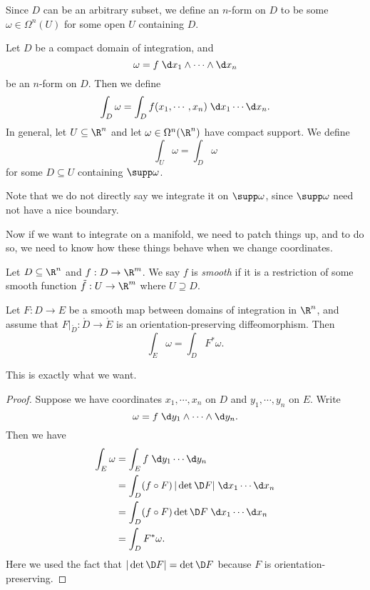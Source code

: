 \documentclass[a4paper]{article}
\begin{document}
Since $D$ can be an arbitrary subset, we define an $n$-form on $D$ to be some $\omega \in \Omega^n(U)$ for some open $U$ containing $D$.

\begin{defi}[Integration on $\R^n$]
  Let $D$ be a compact domain of integration, and
  \[
    \omega = f\; \d x_1 \wedge \cdots \wedge \d x_n
  \]
  be an $n$-form on $D$. Then we define
  \[
    \int_D \omega = \int_D f(x_1, \cdots, x_n) \;\d x_1 \cdots \d x_n.
  \]
  In general, let $U \subseteq \R^n$ and let $\omega \in \Omega^n(\R^n)$ have compact support. We define
  \[
    \int_U \omega = \int_D \omega
  \]
  for some $D\subseteq U$ containing $\supp \omega$.
\end{defi}
Note that we do not directly say we integrate it on $\supp \omega$, since $\supp \omega$ need not have a nice boundary.

Now if we want to integrate on a manifold, we need to patch things up, and to do so, we need to know how these things behave when we change coordinates.

\begin{defi}
  Let $D \subseteq \R^n$ and $f: D \to \R^m$. We say $f$ is \emph{smooth} if it is a restriction of some smooth function $\tilde{f}: U \to \R^m$ where $U \supseteq D$.
\end{defi}

\begin{lemma}
  Let $F: D \to E$ be a smooth map between domains of integration in $\R^n$, and assume that $F|_{\mathring{D}}: \mathring{D} \to \mathring{E}$ is an orientation-preserving diffeomorphism. Then
  \[
    \int_E \omega = \int_D F^* \omega.
  \]
\end{lemma}
This is exactly what we want.

\begin{proof}
  Suppose we have coordinates $x_1, \cdots, x_n$ on $D$ and $y_1, \cdots, y_n$ on $E$. Write
  \[
    \omega = f\;\d y_1 \wedge \cdots \wedge \d y_n.
  \]
  Then we have
  \begin{align*}
    \int_E \omega &= \int_E f\;\d y_1 \cdots \d y_n\\
    &= \int_D (f \circ F)\, |\det \D F|\;\d x_1 \cdots \d x_n\\
    &= \int_D (f \circ F) \det \D F \; \d x_1 \cdots \d x_n\\
    &= \int_D F^* \omega.
  \end{align*}
  Here we used the fact that $|\det \D F| = \det \D F$ because $F$ is orientation-preserving.
\end{proof}
\end{document}
